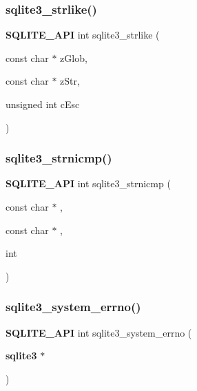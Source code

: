 \subsubsection{sqlite3\_strlike()}
{\footnotesize\ttfamily \textbf{ S\+Q\+L\+I\+T\+E\+\_\+\+A\+PI} int sqlite3\+\_\+strlike (\begin{DoxyParamCaption}\item[{const char $\ast$}]{z\+Glob,  }\item[{const char $\ast$}]{z\+Str,  }\item[{unsigned int}]{c\+Esc }\end{DoxyParamCaption})}

\mbox{\label{sqlite3_8h_a447f0d33bec85d66c5e1ea6c71e41101}} 
\subsubsection{sqlite3\_strnicmp()}
{\footnotesize\ttfamily \textbf{ S\+Q\+L\+I\+T\+E\+\_\+\+A\+PI} int sqlite3\+\_\+strnicmp (\begin{DoxyParamCaption}\item[{const char $\ast$}]{,  }\item[{const char $\ast$}]{,  }\item[{int}]{ }\end{DoxyParamCaption})}

\mbox{\label{sqlite3_8h_aff598b0da141d44902fc2c1fc807b93a}} 
\subsubsection{sqlite3\_system\_errno()}
{\footnotesize\ttfamily \textbf{ S\+Q\+L\+I\+T\+E\+\_\+\+A\+PI} int sqlite3\+\_\+system\+\_\+errno (\begin{DoxyParamCaption}\item[{\textbf{ sqlite3} $\ast$}]{ }\end{DoxyParamCaption})}

\mbox{\label{sqlite3_8h_a06e67f67fc1ac02e1f07490cc837c03f}} 
